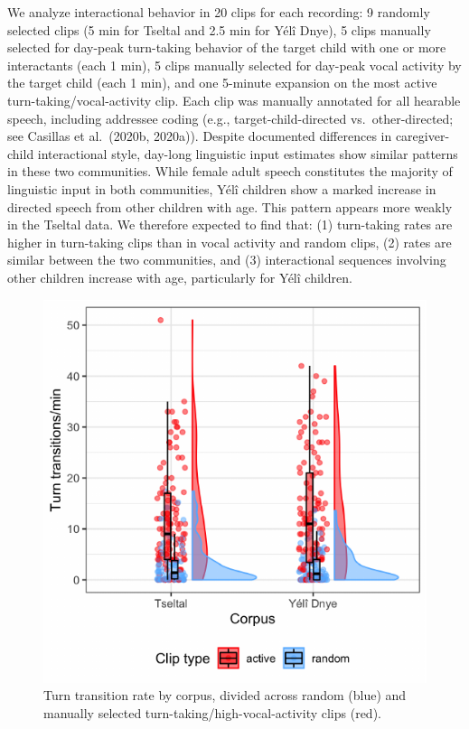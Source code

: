 \documentclass[10pt, letterpaper]{article}
\newenvironment{CodeChunk}{}{}
\begin{document}
We analyze interactional behavior in 20 clips for each recording: 9
randomly selected clips (5 min for Tseltal and 2.5 min for Yélî Dnye), 5
clips manually selected for day-peak turn-taking behavior of the target
child with one or more interactants (each 1 min), 5 clips manually
selected for day-peak vocal activity by the target child (each 1 min),
and one 5-minute expansion on the most active turn-taking/vocal-activity
clip. Each clip was manually annotated for all hearable speech,
including addressee coding (e.g., target-child-directed
vs.~other-directed; see Casillas et al.~(2020b, 2020a)). Despite
documented differences in caregiver-child interactional style, day-long
linguistic input estimates show similar patterns in these two
communities. While female adult speech constitutes the majority of
linguistic input in both communities, Yélî children show a marked
increase in directed speech from other children with age. This pattern
appears more weakly in the Tseltal data. We therefore expected to find
that: (1) turn-taking rates are higher in turn-taking clips than in
vocal activity and random clips, (2) rates are similar between the two
communities, and (3) interactional sequences involving other children
increase with age, particularly for Yélî children.

\begin{CodeChunk}
\begin{figure}[h]

{\centering \includegraphics{figs/tseyel.ttr.fig-1} 

}

\caption[Turn transition rate by corpus, divided across random (blue) and manually selected turn-taking/high-vocal-activity clips (red)]{Turn transition rate by corpus, divided across random (blue) and manually selected turn-taking/high-vocal-activity clips (red).}\label{fig:tseyel.ttr.fig}
\end{figure}
\end{CodeChunk}
\end{document}

